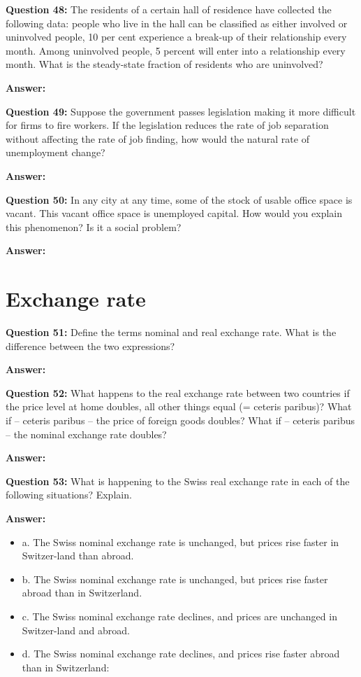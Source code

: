 \documentclass[a4paper, 11pt]{article}
\begin{document}
\textbf{Question 48:} The residents of a certain hall of residence have collected the following data: people who live in the hall can be classified as either involved or uninvolved people, 10 per cent experience a break-up of their relationship every month. Among uninvolved people, 5 percent will enter into a relationship every month. What is the steady-state fraction of residents who are uninvolved?

\textbf{Answer:}

\textbf{Question 49:} Suppose the government passes legislation making it more difficult for firms to fire workers. If the legislation reduces the rate of job separation without affecting the rate of job finding, how would the natural rate of unemployment change?

\textbf{Answer:}

\textbf{Question 50:} In any city at any time, some of the stock of usable office space is vacant. This vacant office space is unemployed capital. How would you explain this phenomenon? Is it a social problem?

\textbf{Answer:}

\section{Exchange rate}

\textbf{Question 51:} Define the terms nominal and real exchange rate. What is the difference between the two expressions?

\textbf{Answer:}

\textbf{Question 52:} What happens to the real exchange rate between two countries if the price level at home doubles, all other things equal (= ceteris paribus)? What if – ceteris paribus – the price of foreign goods doubles? What if – ceteris paribus – the nominal exchange rate doubles?

\textbf{Answer:}

\textbf{Question 53:} What is happening to the Swiss real exchange rate in each of the following situations? Explain.

\textbf{Answer:}
\begin{itemize}
\item a. The Swiss nominal exchange rate is unchanged, but prices rise faster in Switzer-land than abroad.
\item b. The Swiss nominal exchange rate is unchanged, but prices rise faster abroad than in Switzerland.
\item c. The Swiss nominal exchange rate declines, and prices are unchanged in Switzer-land and abroad.
\item d. The Swiss nominal exchange rate declines, and prices rise faster abroad than in Switzerland:
\end{itemize}
\end{document}
